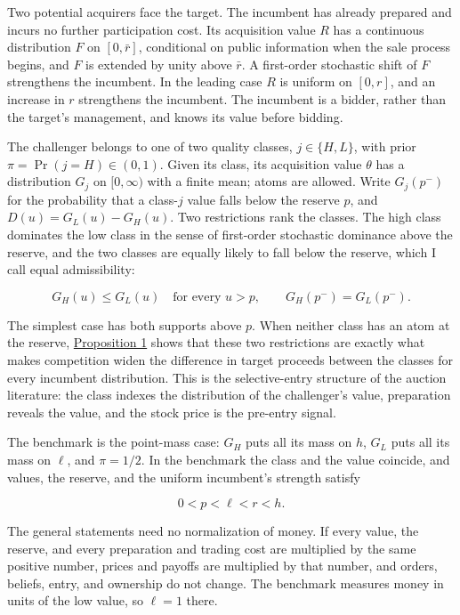 Two potential acquirers face the target. The incumbent has already
prepared and incurs no further participation cost. Its acquisition value
\(R\) has a continuous distribution \(F\) on \([0,\bar r]\), conditional
on public information when the sale process begins, and \(F\) is
extended by unity above \(\bar r\). A first-order stochastic shift of
\(F\) strengthens the incumbent. In the leading case \(R\) is uniform on
\([0,r]\), and an increase in \(r\) strengthens the incumbent. The
incumbent is a bidder, rather than the target's management, and knows
its value before bidding.

The challenger belongs to one of two quality classes, \(j\in\{H,L\}\),
with prior \(\pi=\Pr(j=H)\in(0,1)\). Given its class, its acquisition
value \(\theta\) has a distribution \(G_j\) on \([0,\infty)\) with a
finite mean; atoms are allowed. Write \(G_j(p^-)\) for the probability
that a class-\(j\) value falls below the reserve \(p\), and
\(D(u)=G_L(u)-G_H(u)\). Two restrictions rank the classes. The high
class dominates the low class in the sense of first-order stochastic
dominance above the reserve, and the two classes are equally likely to
fall below the reserve, which I call equal admissibility:

\[
G_H(u)\le G_L(u)\quad\text{for every }u>p,\qquad
G_H(p^-)=G_L(p^-).
\]

The simplest case has both supports above \(p\). When neither class has
an atom at the reserve,
\hyperref[result-proposition-1]{Proposition 1} shows that these two
restrictions are exactly what makes competition widen the difference in
target proceeds between the classes for every incumbent distribution.
This is the
selective-entry structure of the auction literature: the class indexes
the distribution of the challenger's value, preparation reveals the
value, and the stock price is the pre-entry signal.

The benchmark is the point-mass case: \(G_H\) puts all its mass on
\(h\), \(G_L\) puts all its mass on \(\ell\), and \(\pi=1/2\). In the
benchmark the class and the value coincide, and values, the reserve, and
the uniform incumbent's strength satisfy

\[
0<p<\ell<r<h.
\tag{1}\label{eq:paper-1}
\]

The general statements need no normalization of money. If every value,
the reserve, and every preparation and trading cost are multiplied by
the same positive number, prices and payoffs are multiplied by that
number, and orders, beliefs, entry, and ownership do not change. The
benchmark measures money in units of the low value, so \(\ell=1\) there.

